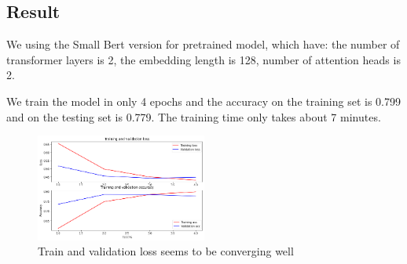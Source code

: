 \documentclass[11pt]{article}
\begin{document}
\subsection{Result}
\quad We using the Small Bert version for pretrained model, which have: the number of transformer layers is 2, the embedding length is 128, number of attention heads is 2.

We train the model in only 4 epochs and the accuracy on the training set is 0.799 and on the testing set is 0.779. The training time only takes about 7 minutes.

\begin{figure}[h]
	\centering
	\includegraphics[width=0.5\textwidth]{graph.png}
	\caption{Train and validation loss seems to be converging well}
	\label{fig1}
\end{figure}











\end{document}
